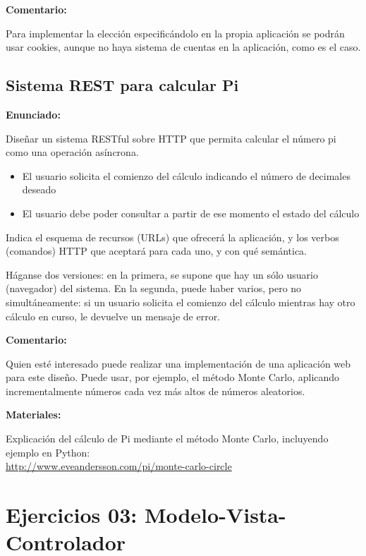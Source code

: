 \textbf{Comentario:}

Para implementar la elección especificándolo en la propia aplicación se podrán usar cookies, aunque no haya sistema de cuentas en la aplicación, como es el caso.

\subsection{Sistema REST para calcular Pi}
\label{subsec:rest-pi}

\textbf{Enunciado:}

Diseñar un sistema RESTful sobre HTTP que permita calcular el número pi como una operación asíncrona.

\begin{itemize}
\item El usuario solicita el comienzo del cálculo indicando el número de decimales deseado
\item El usuario debe poder consultar a partir de ese momento el estado del cálculo
\end{itemize}

Indica el esquema de recursos (URLs) que ofrecerá la aplicación, y los verbos (comandos) HTTP que aceptará para cada uno, y con qué semántica.

Háganse dos versiones: en la primera, se supone que hay un sólo usuario (navegador) del sistema. En la segunda, puede haber varios, pero no simultáneamente: si un usuario solicita el comienzo del cálculo mientras hay otro cálculo en curso, le devuelve un mensaje de error.

\textbf{Comentario:}

Quien esté interesado puede realizar una implementación de una aplicación web para este diseño. Puede usar, por ejemplo, el método Monte Carlo, aplicando incrementalmente números cada vez más altos de números aleatorios.

\textbf{Materiales:}

Explicación del cálculo de Pi mediante el método Monte Carlo, incluyendo ejemplo en Python: \\
\url{http://www.eveandersson.com/pi/monte-carlo-circle}

\section{Ejercicios 03: Modelo-Vista-Controlador}

